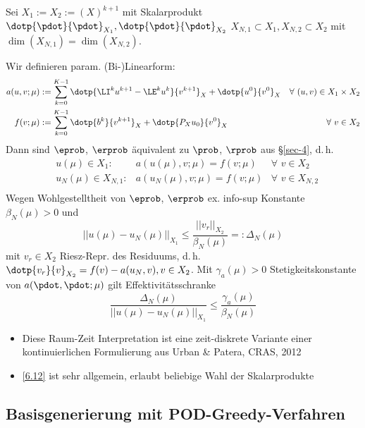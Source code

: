 \begin{kor} \label{6.12}
Sei $X_1 := X_2 := (X)^{k+1}$ mit Skalarprodukt $\dotp{\pdot}{\pdot}_{X_1}, \dotp{\pdot}{\pdot}_{X_2}$ $X_{N,1} \subset X_1, X_{N,2} \subset X_2$ mit $\dim(X_{N,1}) = \dim(X_{N,2})$.

Wir definieren param. (Bi-)Linearform:
\begin{align*}
a(u,v;\mu) &:= \sum\limits_{k=0}^{K-1} \dotp{\LI^k u^{k+1} - \LE^k u^k}{v^{k+1}}_X + \dotp{u^0}{v^0}_X & \forall \,\, (u,v) \in X_1 \times X_2 \\
f(v;\mu) &:= \sum\limits_{k=0}^{K-1} \dotp{b^k}{v^{k+1}}_X + \dotp{P_X u_0}{v^0}_X & \forall \,\, v \in X_2
\end{align*}
Dann sind $\eprob$, $\erprob$ äquivalent zu $\prob$, $\rprob$ aus §\ref{sec-4}, d.\,h.
\begin{align*}
&u(\mu) \in X_1: &a(u(\mu),v;\mu) = f(v;\mu) &\forall \,\, v \in X_2 \\
&u_N(\mu) \in X_{N,1}: &a(u_N(\mu),v;\mu) = f(v;\mu) &\forall \,\, v \in X_{N,2} \\
\end{align*}
Wegen Wohlgestelltheit von $\eprob$, $\erprob$ ex. info-sup Konstante $\beta_N(\mu) > 0$ und 
\[
||u(\mu) - u_N(\mu)||_{X_1} \leq \frac{||v_r||_{X_2}}{\beta_N(\mu)} =: \Delta_N(\mu)
\]
mit $v_r \in X_2$ Riesz-Repr. des Residuums, d.\,h. $\dotp{v_r}{v}_{X_2} = f(v) - a(u_N,v), v \in X_2$. Mit $\gamma_a(\mu) > 0$ Stetigkeitskonstante von $a(\pdot,\pdot;\mu)$ gilt Effektivitätsschranke
\[
	\frac{\Delta_N(\mu)}{||u(\mu) - u_N(\mu)||_{X_1}} \leq \frac{\gamma_a(\mu)}{\beta_N(\mu)} 
\]
\end{kor}

\begin{bem} \beginwithlistbem
	\begin{itemize}
		\item Diese Raum-Zeit Interpretation ist eine zeit-diskrete Variante einer kontinuierlichen Formulierung aus Urban \& Patera, CRAS, 2012
		\item \ref{6.12} ist sehr allgemein, erlaubt beliebige Wahl der Skalarprodukte
	\end{itemize}
\end{bem}

\subsection{Basisgenerierung mit POD-Greedy-Verfahren}

